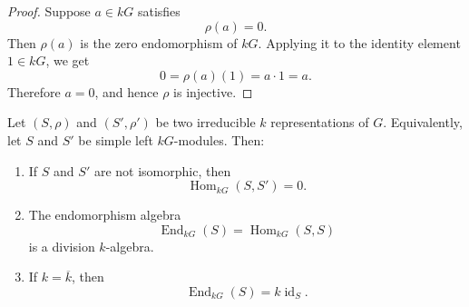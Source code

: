 \begin{proof}
    Suppose \(a\in kG\) satisfies
    \[
        \rho(a)=0.
    \]
    Then \(\rho(a)\) is the zero endomorphism of \(kG\). Applying it to the identity
    element \(1\in kG\), we get
    \[
        0=\rho(a)(1)=a\cdot 1=a.
    \]
    Therefore \(a=0\), and hence \(\rho\) is injective.
\end{proof}

\begin{lemma}
    Let \((S,\rho)\) and \((S',\rho')\) be two irreducible \(k\) representations of
    \(G\). Equivalently, let \(S\) and \(S'\) be simple left \(kG\)-modules. Then:

    \begin{enumerate}
        \item If \(S\) and \(S'\) are not isomorphic, then
              \[
                  \operatorname{Hom}_{kG}(S,S')=0.
              \]

        \item The endomorphism algebra
              \[
                  \operatorname{End}_{kG}(S)
                  =
                  \operatorname{Hom}_{kG}(S,S)
              \]
              is a division \(k\)-algebra.

        \item If \(k=\overline{k}\), then
              \[
                  \operatorname{End}_{kG}(S)=k\operatorname{id}_S.
              \]
    \end{enumerate}
\end{lemma}


